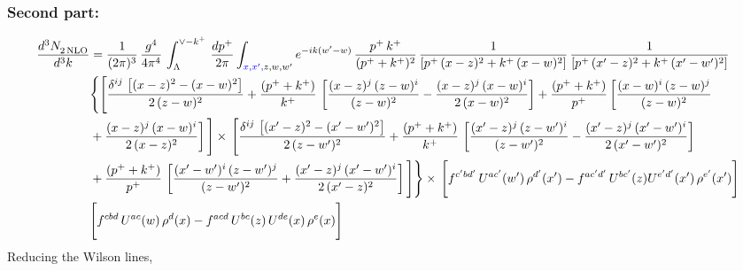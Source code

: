 \documentclass[9pt]{article}
\numberwithin{equation}{section}
\begin{document}
\subsubsection{Second part:\,}
\begin{align}
    \frac{d^{3}N_{2\,\rm NLO}^{\rm}}{d^{3}k}  & = \frac{1}{(2\pi)^{3}}\, \frac{g^{4}}{4\pi^{4}}\,\int_{\Lambda}^{\vee-k^{+}}\, \frac{dp^{+}}{2\pi}\int_{{\color{blue}x,x',} z,w,w^{\prime}} e^{-ik(w^{\prime}-w)}\,\frac{p^{+}\,k^{+}}{(p^{+}+k^{+})^{2}}\, \frac{1}{\left[p^{+}\,(x-z)^{2}+k^{+}\,(x-w)^{2}\right]}\,\frac{1}{\left[p^{+}\,(x'-z)^{2}+k^{+}\,(x'-w')^{2}\right]}\notag \\ & \Bigg\{\Bigg[\frac{\delta^{ij}\, \left[(x-z)^{2}-(x-w)^{2}\right]}{2\,(z-w)^{2}} + \frac{(p^{+}+k^{+})}{k^{+}}\, \left[\frac{(x-z)^{j}\,(z-w)^{i}}{(z-w)^{2}}-\frac{(x-z)^{j}\,(x-w)^{i}}{2\,(x-w)^{2}}\right]+\frac{(p^{+}+k^{+})}{p^{+}}\,\bigg[\frac{(x-w)^{i}\,(z-w)^{j}}{(z-w)^{2}}\notag \\ & +\frac{(x-z)^{j}\,(x-w)^{i}}{2\,(x-z)^{2}}\bigg]\,\Bigg]\times\, \Bigg[\frac{\delta^{ij}\, \left[(x'-z)^{2}-(x'-w')^{2}\right]}{2\,(z-w')^{2}}+ \frac{(p^{+}+k^{+})}{k^{+}}\, \left[\frac{(x'-z)^{j}\,(z-w')^{i}}{(z-w')^{2}}-\frac{(x'-z)^{j}\,(x'-w')^{i}}{2\,(x'-w')^{2}}\right]\notag \\ & +\frac{(p^{+}+k^{+})}{p^{+}}\,\left[\frac{(x'-w')^{i}\,(z-w')^{j}}{(z-w')^{2}} +\frac{(x'-z)^{j}\,(x'-w')^{i}}{2\,(x'-z)^{2}}\right] \Bigg] \Bigg\} \times\, \Bigg[f^{c'bd'}\, U^{ac'}(w')\,\rho^{d'}(x')-f^{ac'd'}\, U^{bc'}(z)U^{e'd'}(x')\, \rho^{e'}(x')\Bigg]\notag \\ & \Bigg[f^{cbd}\, U^{ac}(w)\,\rho^{d}(x) - f^{acd}\, U^{bc}(z)\,U^{de}(x)\, \rho^{e}(x)\Bigg]
\end{align}
Reducing the Wilson lines, 
\end{document}
